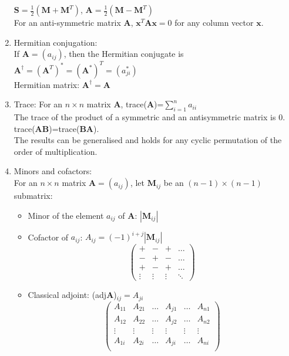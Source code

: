 \documentclass[fleqn]{article}
\begin{document}
\begin{enumerate}
        $\bm{S}=\frac{1}{2}(\bm{M}+\bm{M}^T)$, $\bm{A}=\frac{1}{2}(\bm{M}-\bm{M}^T)$\\
        For an anti-symmetric matrix $\bm{A}$, $\bm{x}^T\bm{Ax}=0$ for any column vector $\bm{x}$.
    \item Hermitian conjugation:\\
        If $\bm{A}=(a_{ij})$, then the Hermitian conjugate is $\bm{A}^\dagger=(\bm{A}^T)^*=(\bm{A}^*)^T=(a^*_{ji})$\\
        Hermitian matrix: $\bm{A}^\dagger=\bm{A}$
    \item Trace: 
        For an $n\times n$ matrix $\bm{A}$, trace($\bm{A}$)=$\displaystyle\sum_{i=1}^n a_{ii}$\\
        The trace of the product of a symmetric and an antisymmetric matrix is 0.\\
        trace($\bm{AB}$)=trace($\bm{BA}$).\\
        The results can be generalised and holds for any cyclic permutation of the order of multiplication.
    \item Minors and cofactors:\\
        For an $n\times n$ matrix $\bm{A}=(a_{ij})$, let $\bm{M}_{ij}$ be an $(n-1)\times(n-1)$ submatrix:
        \begin{itemize}[label={--}, topsep=0pt]
            \item Minor of the element $a_{ij}$ of $\bm{A}$: $|\bm{M}_{ij}|$
            \item Cofactor of $a_{ij}$: $A_{ij}=(-1)^{i+j}|\bm{M}_{ij}|$
                \[\begin{pmatrix}
                    + & - & + & \dots \\
                    - & + & - & \dots \\
                    + & - & + & \dots \\
                    \vdots & \vdots & \vdots & \ddots
                \end{pmatrix}\]
            \item Classical adjoint: (adj$\bm{A}$)$_{ij}=A_{ji}$
                \[\begin{pmatrix}
                    A_{11} & A_{21} & \dots  & A_{j1} & \dots  & A_{n1}\\
                    A_{12} & A_{22} & \dots  & A_{j2} & \dots  & A_{n2}\\
                    \vdots & \vdots & \vdots & \vdots & \vdots & \vdots\\
                    A_{1i} & A_{2i} & \dots  & A_{ji} & \dots  & A_{ni}\\

\end{pmatrix}\]
\end{itemize}
\end{enumerate}
\end{document}
